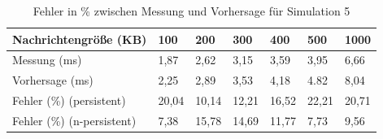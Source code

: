 \begin{table}
\centering
  \begin{tabular}{| l | l | l | l |l | l | l |}
    \hline
    Nachrichtengröße (KB) & 100 & 200 & 300 & 400 & 500 & 1000 \\ \hline
    Messung (ms) & 1,87 & 2,62 & 3,15 & 3,59 & 3,95 & 6,66\\ \hline
    Vorhersage (ms) & 2,25 & 2,89 & 3,53 & 4,18 & 4.82 & 8,04\\ \hline
    Fehler (\%) (persistent) & 20,04 & 10,14 & 12,21 & 16,52 & 22,21 & 20,71\\ \hline
    Fehler (\%) (n-persistent) & 7,38 & 15,78 & 14,69 & 11,77 & 7,73 & 9,56\\ \hline
    
    
    \hline
      \end{tabular}
	\caption{\label{tab:sim5} Fehler in \% zwischen Messung und Vorhersage für Simulation 5}
\end{table}


